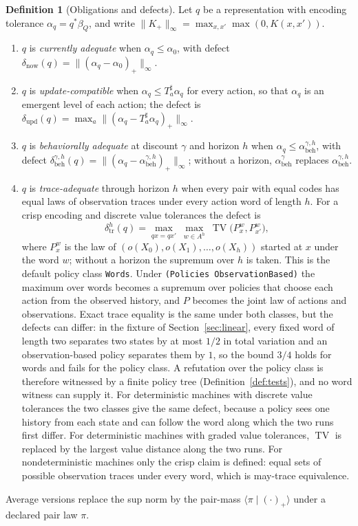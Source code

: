 \documentclass[11pt]{article}
\newcommand{\code}[1]{\texttt{#1}}
\newcommand{\lift}{^{\sharp}}
\newcommand{\br}[2]{\langle #1 \mid #2 \rangle}
\newcommand{\TV}{\operatorname{TV}}
\newcommand{\dnow}{\delta_{\mathrm{now}}}
\newcommand{\dupd}{\delta_{\mathrm{upd}}}
\newcommand{\dbd}{\delta_{\mathrm{beh}}}
\newcommand{\dtr}{\delta_{\mathrm{tr}}}
\newcommand{\abeh}{\alpha_{\mathrm{beh}}}
\theoremstyle{definition}
\newtheorem{definition}{Definition}[section]
\theoremstyle{plain}
\begin{document}
\begin{definition}[Obligations and defects]\label{def:defects}
Let $q$ be a representation with encoding tolerance $\alpha_q=q^*\beta_Q$, and write
$\|K_+\|_\infty=\max_{x,x'}\max(0,K(x,x'))$.
\begin{enumerate}
\item $q$ is \emph{currently adequate} when $\alpha_q\le\alpha_0$, with defect
$\dnow(q)=\|(\alpha_q-\alpha_0)_+\|_\infty$.
\item $q$ is \emph{update-compatible} when $\alpha_q\le T_a\lift\alpha_q$ for every action, so
that $\alpha_q$ is an emergent level of each action; the defect is
$\dupd(q)=\max_a\|(\alpha_q-T_a\lift\alpha_q)_+\|_\infty$.
\item $q$ is \emph{behaviorally adequate} at discount $\gamma$ and horizon $h$ when
$\alpha_q\le\abeh^{\gamma,h}$, with defect $\dbd^{\gamma,h}(q)=\|(\alpha_q-\abeh^{\gamma,h})_+\|_\infty$;
without a horizon, $\abeh^\gamma$ replaces $\abeh^{\gamma,h}$.
\item $q$ is \emph{trace-adequate} through horizon $h$ when every pair with equal codes has equal
laws of observation traces under every action word of length $h$. For a crisp encoding and
discrete value tolerances the defect is
\[
\dtr^h(q)=\max_{qx=qx'}\ \max_{w\in A^h}\ \TV\bigl(P^w_x,P^w_{x'}\bigr),
\]
where $P^w_x$ is the law of $(o(X_0),o(X_1),\dots,o(X_h))$ started at $x$ under the word $w$;
without a horizon the supremum over $h$ is taken. This is the default policy class \code{Words}.
Under \code{(Policies ObservationBased)} the maximum over words becomes a supremum over
policies that choose each action from the observed history, and $P$ becomes the joint law of
actions and observations. Exact trace equality is the same under both classes, but the defects
can differ: in the fixture of Section~\ref{sec:linear}, every fixed word of length two separates two
states by at most $1/2$ in total variation and an observation-based policy separates them by $1$, so
the bound $3/4$ holds for words and fails for the policy class. A refutation over the policy class
is therefore witnessed by a finite policy tree (Definition~\ref{def:tests}), and no word witness can
supply it. For deterministic machines with discrete value tolerances the two classes give the same
defect, because a policy sees one history from each state and can follow the word along which the
two runs first differ. For deterministic machines with
graded value tolerances, $\TV$ is replaced by the largest value distance along the two runs. For
nondeterministic machines only the crisp claim is defined: equal sets of possible observation
traces under every word, which is may-trace equivalence.
\end{enumerate}
Average versions replace the sup norm by the pair-mass $\br{\pi}{(\cdot)_+}$ under a declared
pair law $\pi$.
\end{definition}
\end{document}
